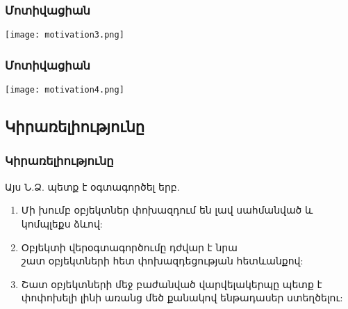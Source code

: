 \documentclass{beamer}
\begin{document}
\begin{frame}\frametitle{Մոտիվացիան}
\begin{center}
    \texttt{[image: motivation3.png]}
\end{center}
\end{frame}

\begin{frame}\frametitle{Մոտիվացիան}
\begin{center}
    \texttt{[image: motivation4.png]}
\end{center}
\end{frame}

\subsection{Կիրառելիությունը}
\begin{frame}\frametitle{Կիրառելիությունը}
Այս Ն.Ձ. պետք է օգտագործել երբ.
\vfill
\begin{enumerate}
    \item Մի խումբ օբյեկտներ փոխազդում են լավ սահմանված և կոմպլեքս ձևով: \vfill
    \item Օբյեկտի վերօգտագործումը դժվար է նրա\\ շատ օբյեկտների հետ
    փոխազդեցության հետևանքով: \vfill
    \item Շատ օբյեկտների մեջ բաժանված վարվելակերպը պետք է փոփոխելի լինի
    առանց մեծ քանակով ենթադասեր ստեղծելու:
\end{enumerate}
\end{frame}
\end{document}
